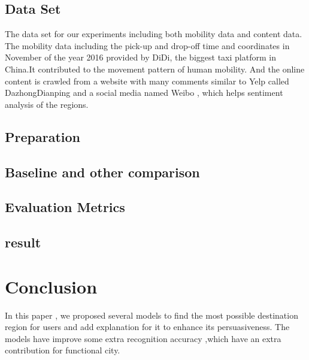 \documentclass[runningheads]{llncs}
\begin{document}
\subsection{Data Set}
The data set for our experiments including both mobility data and content data.
The mobility data including the pick-up and drop-off time and coordinates in November of the year 2016 provided by DiDi, the biggest taxi platform in China.It contributed to the movement pattern of human mobility.
And the online content is crawled from a website with many comments similar to Yelp called DazhongDianping and a social media named Weibo , which helps sentiment analysis of the regions.

\subsection{Preparation}

\subsection{Baseline and other comparison}

\subsection{Evaluation Metrics}

\subsection{result}

\section{Conclusion}
In this paper , we proposed several models to find the most possible destination region for users and add explanation for it to enhance its persuasiveness.
The models have improve some extra recognition accuracy ,which have an extra contribution for functional city.
\end{document}
